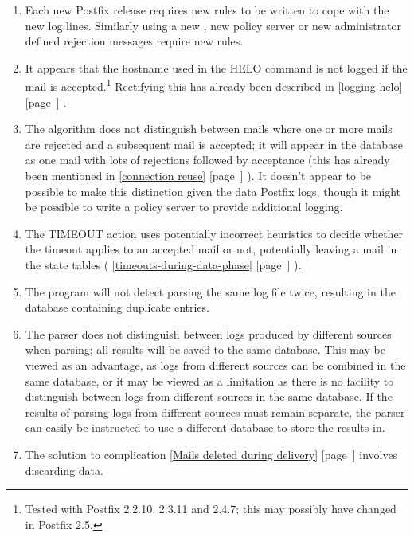 \documentclass[a4paper,12pt,draft]{article}
\newcommand{\refwithpage}[1]{%
    \empty{}\ref{#1} [page~\pageref{#1}]%
}
\newcommand{\sectionref}[1]{%
    \textsection{}\refwithpage{#1}%
}
\begin{document}
\begin{enumerate}

    \item Each new Postfix release requires new rules to be written to cope
        with the new log lines.  Similarly using a new \RBL{}, new policy
        server or new administrator defined rejection messages require new
        rules.

    \item It appears that the hostname used in the HELO command is not
        logged if the mail is accepted.\footnote{Tested with Postfix
        2.2.10, 2.3.11 and 2.4.7; this may possibly have changed in Postfix
        2.5.}  Rectifying this has already been described in
        \sectionref{logging helo}.

    \item The algorithm does not distinguish between mails where one or
        more mails are rejected and a subsequent mail is accepted; it will
        appear in the database as one mail with lots of rejections followed
        by acceptance (this has already been mentioned in
        \sectionref{connection reuse}).  It doesn't appear to be possible
        to make this distinction given the data Postfix logs, though it
        might be possible to write a policy server to provide additional
        logging.

    \item The TIMEOUT action uses potentially incorrect heuristics to
        decide whether the timeout applies to an accepted mail or not,
        potentially leaving a mail in the state tables
        (\sectionref{timeouts-during-data-phase}).

    \item The program will not detect parsing the same log file twice,
        resulting in the database containing duplicate entries.

    \item The parser does not distinguish between logs produced by
        different sources when parsing; all results will be saved to the
        same database.  This may be viewed as an advantage, as logs from
        different sources can be combined in the same database, or it may
        be viewed as a limitation as there is no facility to distinguish
        between logs from different sources in the same database.  If the
        results of parsing logs from different sources must remain
        separate, the parser can easily be instructed to use a different
        database to store the results in.

    \item The solution to complication \sectionref{Mails deleted during
        delivery} involves discarding data.

\end{enumerate}
\end{document}
